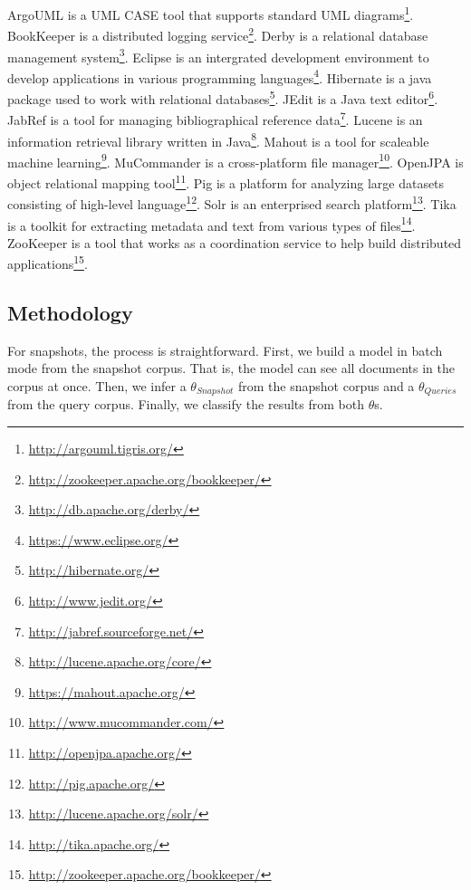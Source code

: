 ArgoUML is a UML CASE tool that supports standard UML diagrams\footnote{\url{http://argouml.tigris.org/}}.
BookKeeper is a distributed logging service\footnote{\url{http://zookeeper.apache.org/bookkeeper/}}.
Derby is a relational database management system\footnote{\url{http://db.apache.org/derby/}}.
Eclipse is an intergrated development environment to develop applications in various programming languages\footnote{\url{https://www.eclipse.org/}}.
Hibernate is a java package used to work with relational databases\footnote{\url{http://hibernate.org/}}.
JEdit is a Java text editor\footnote{\url{http://www.jedit.org/}}.
JabRef is a tool for managing bibliographical reference data\footnote{\url{http://jabref.sourceforge.net/}}.
Lucene is an information retrieval library written in Java\footnote{\url{http://lucene.apache.org/core/}}.
Mahout is a tool for scaleable machine learning\footnote{\url{https://mahout.apache.org/}}.
MuCommander is a cross-platform file manager\footnote{\url{http://www.mucommander.com/}}.
OpenJPA is object relational mapping tool\footnote{\url{http://openjpa.apache.org/}}.
Pig is a platform for analyzing large datasets consisting of high-level language\footnote{\url{http://pig.apache.org/}}.
Solr is an enterprised search platform\footnote{\url{http://lucene.apache.org/solr/}}.
Tika is a toolkit for extracting metadata and text from various types of files\footnote{\url{http://tika.apache.org/}}.
ZooKeeper is a tool that works as a coordination service to help build distributed applications\footnote{\url{http://zookeeper.apache.org/bookkeeper/}}.



\subsection{Methodology}
\label{sec:methodology}

For snapshots, the process is straightforward.
First, we build a model in batch mode from the snapshot corpus.
That is, the model can see all documents in the corpus at once.
Then, we infer a $\theta_{Snapshot}$ from the snapshot corpus
and a $\theta_{Queries}$ from the query corpus.
Finally, we classify the results from both $\theta$s.

\begin{comment}
\begin{enumerate}
    \item Build model from the snapshot corpus in batch mode
    \item Infer a $\theta_{Snapshot}$ from the snapshot corpus
    \item Infer a $\theta_{Queries}$ from the query corpus
    \item Classify, or rank, the results from both $\theta$s
\end{enumerate}
\end{comment}


